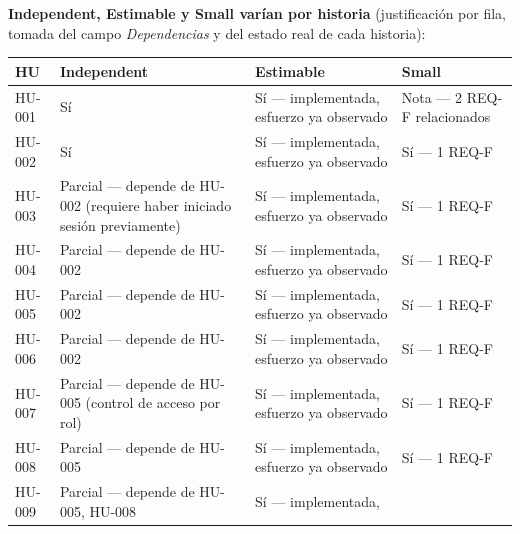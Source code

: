 \documentclass[
  spanish,
]{article}
\newcounter{none} %
\begin{document}
\textbf{Independent, Estimable y Small varían por historia}
(justificación por fila, tomada del campo \emph{Dependencias} y del
estado real de cada historia):

{\def\LTcaptype{none} %
\begin{longtable}[]{@{}
  >{\raggedright\arraybackslash}p{}
  >{\raggedright\arraybackslash}p{}
  >{\raggedright\arraybackslash}p{}
  >{\raggedright\arraybackslash}p{}@{}}
\toprule\noalign{}
\begin{minipage}[b]{\linewidth}\raggedright
HU
\end{minipage} & \begin{minipage}[b]{\linewidth}\raggedright
Independent
\end{minipage} & \begin{minipage}[b]{\linewidth}\raggedright
Estimable
\end{minipage} & \begin{minipage}[b]{\linewidth}\raggedright
Small
\end{minipage} \\
\midrule\noalign{}
\endhead
\bottomrule\noalign{}
\endlastfoot
HU-001 & Sí & Sí --- implementada, esfuerzo ya observado & Nota --- 2
REQ-F relacionados \\
HU-002 & Sí & Sí --- implementada, esfuerzo ya observado & Sí --- 1
REQ-F \\
HU-003 & Parcial --- depende de HU-002 (requiere haber iniciado sesión
previamente) & Sí --- implementada, esfuerzo ya observado & Sí --- 1
REQ-F \\
HU-004 & Parcial --- depende de HU-002 & Sí --- implementada, esfuerzo
ya observado & Sí --- 1 REQ-F \\
HU-005 & Parcial --- depende de HU-002 & Sí --- implementada, esfuerzo
ya observado & Sí --- 1 REQ-F \\
HU-006 & Parcial --- depende de HU-002 & Sí --- implementada, esfuerzo
ya observado & Sí --- 1 REQ-F \\
HU-007 & Parcial --- depende de HU-005 (control de acceso por rol) & Sí
--- implementada, esfuerzo ya observado & Sí --- 1 REQ-F \\
HU-008 & Parcial --- depende de HU-005 & Sí --- implementada, esfuerzo
ya observado & Sí --- 1 REQ-F \\
HU-009 & Parcial --- depende de HU-005, HU-008 & Sí --- implementada,

\end{longtable}}
\end{document}

